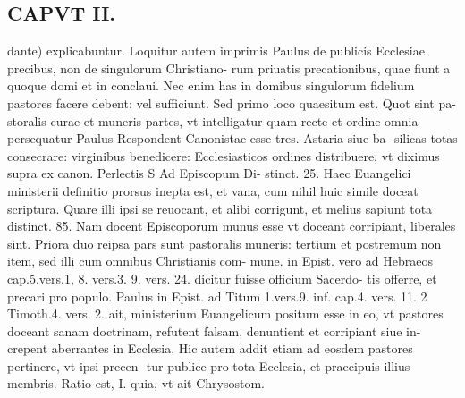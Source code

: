 \documentclass{article}
\begin{document}
\begin{pages}
\section{CAPVT  II. }
\marginpar{[ p.39 ]}\pstart dante) explicabuntur. Loquitur autem imprimis Paulus de publicis Ecclesiae precibus, non de singulorum Christiano- rum priuatis precationibus, quae fiunt a quoque domi et in conclaui. Nec enim has in domibus singulorum fidelium pastores facere debent: vel sufficiunt. Sed primo loco quaesitum est. Quot sint pa- storalis curae et muneris partes, vt intelligatur quam recte et ordine omnia persequatur Paulus Respondent Canonistae esse tres. Astaria siue ba- silicas totas consecrare: virginibus benedicere: Ecclesiasticos ordines distribuere, vt diximus supra ex canon. Perlectis S Ad Episcopum Di- stinct. 25. Haec Euangelici ministerii definitio prorsus inepta est, et vana, cum nihil huic simile doceat scriptura. Quare illi ipsi se reuocant, et alibi corrigunt, et melius sapiunt tota distinct. 85. Nam docent Episcoporum munus esse vt doceant corripiant, liberales sint. Priora duo reipsa pars sunt pastoralis muneris: tertium et postremum non item, sed illi cum omnibus Christianis com- mune. in Epist. vero ad Hebraeos cap.5.vers.1, 8. vers.3. 9. vers. 24. dicitur fuisse officium Sacerdo- tis offerre, et precari pro populo. Paulus in Epist. ad Titum 1.vers.9. inf. cap.4. vers. 11. 2 Timoth.4. vers. 2. ait, ministerium Euangelicum positum esse in eo, vt pastores doceant sanam doctrinam, refutent falsam, denuntient et corripiant siue in- crepent aberrantes in Ecclesia. Hic autem addit etiam ad eosdem pastores pertinere, vt ipsi precen- tur publice pro tota Ecclesia, et praecipuis illius membris. Ratio est, I. quia, vt ait Chrysostom.  \pend

\end{pages}
\end{document}
